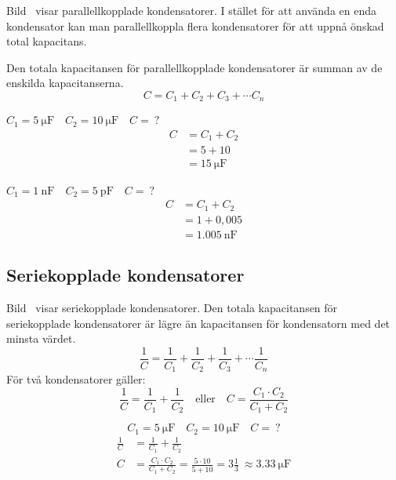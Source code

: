 
Bild~ visar parallellkopplade kondensatorer.
I stället för att använda en enda kondensator kan man parallellkoppla flera
kondensatorer för att uppnå önskad total kapacitans.

Den totala kapacitansen för parallellkopplade kondensatorer är summan av de
enskilda kapacitanserna.
%
\[
  C = C_1 + C_2 + C_3 + \cdots C_n
\]
%

\begin{exempelbox}
\(C_1 = \qty{5}{\micro\farad} \quad C_2 = \qty{10}{\micro\farad} \quad C =\ ?\)
\tcblower
\vspace{-\baselineskip}
  \begin{align*}
    C &= C_1 + C_2 \\[1ex]
    &= 5 + 10 \\[1ex]
    &= \qty{15}{\micro\farad}
  \end{align*}
\end{exempelbox}

\begin{exempelbox}
\(C_1 = \qty{1}{\nano\farad} \quad C_2 = \qty{5}{\pico\farad} \quad C =\ ?\)
\tcblower
\vspace{-\baselineskip}
  \begin{align*}
    C &= C_1 + C_2 \\[1ex]
    &= 1 + 0,005 \\[1ex]
    &= \qty{1,005}{\nano\farad}
  \end{align*}
\end{exempelbox}

\subsection{Seriekopplade kondensatorer}
\label{seriekopplade_kondensatorer}


Bild~ visar seriekopplade kondensatorer.
Den totala kapacitansen för seriekopplade kondensatorer är lägre än kapacitansen
för kondensatorn med det minsta värdet.
%
\[
\frac{1}{C} = \frac{1}{C_1} + \frac{1}{C_2} +
\frac{1}{C_3} + \cdots \frac{1}{C_n}
\]
%
För två kondensatorer gäller:
\[
  \frac{1}{C} = \frac{1}{C_1} + \frac{1}{C_2} \quad \text{eller} \quad
  C = \frac{C_1 \cdot C_2}{C_1 + C_2}
\]
\begin{exempelbox}
\noindent
\[ C_1 = \qty{5}{\micro\farad} \quad C_2 = \qty{10}{\micro\farad} \quad C =\ ? \]
\tcblower
\vspace{-\baselineskip}
    \begin{align*}
      \frac{1}{C} &= \frac{1}{C_1} + \frac{1}{C_2} \\[1ex]
      C &= \frac{C_1 \cdot C_2}{C_1 + C_2}
      = \frac{5 \cdot 10}{5 + 10}
      = 3\frac{1}{3}\
      \approx \qty{3,33}{\micro\farad}
    \end{align*}
\end{exempelbox}

